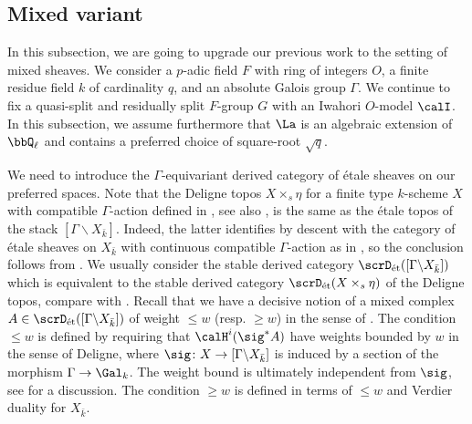 \documentclass[10pt, reqno]{amsart}
\theoremstyle{plain}
\theoremstyle{definition}
\numberwithin{equation}{section}
\begin{document}
	
	
	\subsection{Mixed variant}
	
	In this subsection, we are going to upgrade our previous work to the setting of mixed sheaves. We consider a $p$-adic field $F$ with ring of integers $O$, a finite residue field $k$ of cardinality $q$, and an absolute Galois group $\Gamma$. We continue to fix a quasi-split and residually split $F$-group $G$ with an Iwahori $O$-model $\calI$. In this subsection, we assume furthermore that $\La$ is an algebraic extension of $\bbQ_\ell$ and contains a preferred choice of square-root $\sqrt{q}$.
	
	We need to introduce the $\Gamma$-equivariant derived category of étale sheaves on our preferred spaces. Note that the Deligne topos $X\times_s \eta$ for a finite type $k$-scheme $X$ with compatible $\Gamma$-action defined in \cite{SGA7.2}, see also \cite[Definition A.1.3]{HZ23}, is the same as the étale topos of the stack $[\Gamma \backslash X_{\bar k}]$. Indeed, the latter identifies by descent with the category of étale sheaves on $X_{\bar k}$ with continuous compatible $\Gamma$-action as in \cite[Definition A.1.2]{HZ23}, so the conclusion follows from \cite[Lemma A.1.4]{HZ23}.  We usually consider the stable derived category $\scrD_{\mathrm{\acute{e}t}}([\Gamma\backslash X_{\bar k}])$ which is equivalent to the stable derived category $\scrD_{\mathrm{\acute{e}t}}(X\times_s \eta)$ of the Deligne topos, compare with \cite[Construction A.1.6 and Definition B.1.1]{HZ23}. Recall that we have a decisive notion of a mixed complex $A \in \scrD_{\mathrm{\acute{e}t}}([\Gamma \backslash X_{\bar k}] )$ of weight $\leq w$ (resp. $\geq w$) in the sense of \cite[Definition 2.4.4]{HZ23}. The condition $\leq w$ is defined by requiring that $\calH^i(\sig^*A)$ have weights bounded by $w$ in the sense of Deligne, where $\sig \colon X \to [\Gamma \backslash X_{\bar k}]$ is induced by a section of the morphism $\Gamma \to \Gal_k$. The weight bound is ultimately independent from $\sig$, see \cite[Section 2.4]{HZ23} for a discussion. The condition $\geq w$ is defined in terms of $\leq w$ and Verdier duality for $X_{\bar k}$.
	
\end{document}
